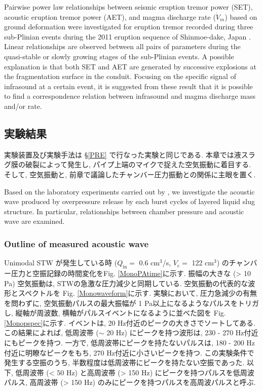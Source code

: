 \documentclass[12pt]{article}
\begin{document}
Pairwise power law relationships between seismic eruption tremor power (SET), acoustic eruption tremor
power (AET), and magma discharge rate ($\dot{V}_m$) based on ground deformation were investigated for eruption tremor recorded during three sub-Plinian events during the 2011 eruption sequence of Shinmoe-dake, Japan \citep{Ichihara2016a}. 
Linear relationships are observed between all pairs of parameters during the quasi-stable or slowly growing stages of the sub-Plinian events. A possible explanation is that both SET and AET are generated by successive explosions at the fragmentation surface in the conduit. 
Focusing on the specific signal of infrasound at a certain event, it is suggested from these result that it is possible to find a correspondence relation between infrasound and magma discharge mass and/or rate.

\clearpage \newpage
\subsection{実験結果}\label{ACOresult}
実験装置及び実験手法は \S \ref{PRE} で行なった実験と同じである. 本章では液スラグ膜の破裂によって発生し, パイプ上端のマイクで捉えた空気振動に着目する. そして, 空気振動と, 前章で議論したチャンバー圧力振動との関係に主眼を置く.  

Based on the laboratory experiments carried out by \cite{kanno2018}, we investigate the acoustic wave produced by overpressure release by each burst cycles of layered liquid slug structure. 
In particular, relationships between chamber pressure and acoustic wave are examined.


\subsubsection{Outline of measured acoustic wave}
Unimodal STW が発生している時 ($Q_\mathrm{in}=$ 0.6 cm$^3$/s, $V_\mathrm{c}=$ 122 cm$^3$) のチャンバー圧力と空振記録の時間変化をFig. \ref{MonoPAtime}に示す. 
振幅の大きな (> 10 Pa) 空気振動は, STWの急激な圧力減少と同期している.
空気振動の代表的な波形とスペクトルを Fig. \ref{Monowaveform}に示す. 
実験において, 圧力急減少の有無を問わずに, 空気振動パルスの最大振幅が 1 Pa以上になるようなパルスをトリガし, 縦軸が周波数, 横軸がパルスイベントになるように並べた図を Fig. \ref{Monopspec}に示す. 
イベントは, 20 Hz付近のピークの大きさでソートしてある. 
この結果によれば, 低周波帯 ($\sim$ 20 Hz) にピークを持つ波形は, 230 - 270 Hz付近にもピークを持つ. 
一方で, 低周波帯にピークを持たないパルスは, 180 - 200 Hz付近に明瞭なピークをもち, 270 Hz付近に小さいピークを持つ. 
この実験条件で発生する空振のうち, 半数程度は低周波帯にピークを持たない空振であった. 
以下, 低周波帯 (< 50 Hz) と高周波帯 (> 150 Hz) にピークを持つパルスを低周波パルス, 高周波帯 (> 150 Hz) のみにピークを持つパルスを高周波パルスと呼ぶ. 
\end{document}
